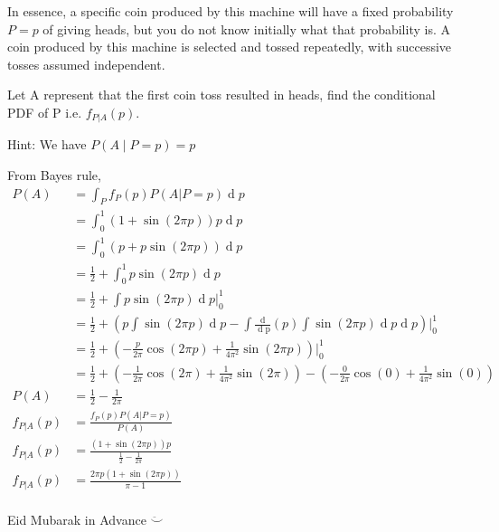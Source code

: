 \documentclass[answers]{exam}
\begin{document}
\begin{questions}
{        In essence, a specific coin produced by this machine will have a fixed probability $P = p$ of giving heads, but you do not know initially what that probability is. A coin produced by this machine is selected and tossed repeatedly, with successive tosses assumed independent.

        Let A represent that the first coin toss resulted in heads, find the conditional PDF of P i.e. $f_{P|A}(p)$.

        Hint: We have $P(A\;|\;P=p) = p$
    }

    \begin{framed}
        From Bayes rule,
        \begin{equation*}
            \begin{split}
                P(A) & = \int_{P}f_P(p)P(A|P=p)\operatorname{d}p\\
                     & = \int_{0}^{1}(1 + \sin{(2\pi p)})p\operatorname{d}p\\
                     & = \int_{0}^{1}(p + p\sin{(2\pi p)})\operatorname{d}p\\
                     & = \frac{1}{2}+\int_{0}^{1}p\sin{(2\pi p)}\operatorname{d}p\\
                     & = \frac{1}{2}+\int p\sin{(2\pi p)}\operatorname{d}p\bigg|_{0}^{1}\\
                     & = \frac{1}{2}+\left(p\int \sin{(2\pi p)}\operatorname{d}p-\int \operatorname{\frac{d}{\operatorname{d}p}}(p)\int \sin{(2\pi p)}\operatorname{d}p\operatorname{d}p\right)\bigg|_{0}^{1}\\
                     & = \frac{1}{2}+\left(-\frac{p}{2\pi} \cos{(2\pi p)}+\frac{1}{4\pi^2}\sin{(2\pi p)}\right)\bigg|_{0}^{1}\\
                     & = \frac{1}{2}+\left(-\frac{1}{2\pi} \cos{(2\pi)}+\frac{1}{4\pi^2}\sin{(2\pi )}\right)-\left(-\frac{0}{2\pi} \cos{(0)}+\frac{1}{4\pi^2}\sin{(0)}\right)\\
                P(A) & = \frac{1}{2}-\frac{1}{2\pi}\\
                f_{P|A}(p) & = \frac{f_{P}(p)P(A|P=p)}{P(A)}\\
                f_{P|A}(p) & = \frac{\left(1 + \sin{(2\pi p)}\right)p}{\frac{1}{2}-\frac{1}{2\pi}}\\
                f_{P|A}(p) & = \frac{2\pi p\left(1 + \sin{(2\pi p)}\right)}{\pi-1}\\
            \end{split}
        \end{equation*}
    \end{framed}
\end{questions}

\noindent
\hrulefill \; Eid Mubarak in Advance $\ddot \smile$ \; \hrulefill
\end{document}
